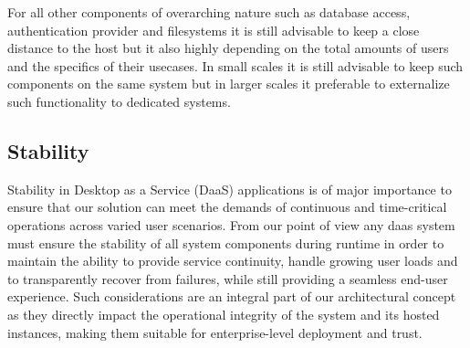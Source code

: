 \documentclass[runningheads]{llncs}
\begin{document}
For all other components of overarching nature
such as database access, authentication provider and filesystems
it is still advisable to keep a close distance to the host
but it also highly depending on the total amounts of users
and the specifics of their usecases.
In small scales it is still advisable to keep such components on the same system
but in larger scales it preferable to externalize such functionality to dedicated systems.


\subsection{Stability}
%


Stability in Desktop as a Service (DaaS) applications is of major importance
to ensure that our solution can meet the demands of continuous
and time-critical operations across varied user scenarios.
From our point of view any daas system must ensure the stability
of all system components during runtime
in order to maintain the ability to provide service continuity,
handle growing user loads and to transparently recover from failures,
while still providing a seamless end-user experience.
Such considerations are an integral part of our architectural concept
as they directly impact the operational integrity
of the system and its hosted instances,
making them suitable for enterprise-level deployment and trust.
\end{document}
